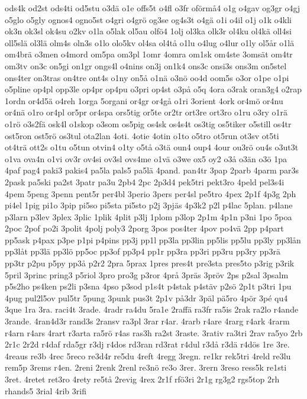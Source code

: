 {ods4k
od2st
ods4ti
od5stu
o3dä
o1e
offs5t
o4fl
o3fr
oförmå4
o1g
o4gav
og3gr
o4gj
o5glo
o5gly
ognos4
ogno5st
o4gri
o4grö
og3se
og4s3t
o4gä
o1i
o4il
o1j
o1k
o4kli
ok3n
ok3sl
ok4su
o2kv
o1la
o5lak
ol5au
olfö4
1olj
ol3ka
olk3r
ol4ku
ol4kä
oll4si
oll5slä
ol3lä
olm4s
oln3s
o1lo
olo5kv
ol4sa
ol4tå
o1lu
o4lug
o4lur
o1ly
ol5år
o1lä
om4brä
o3men
o4mord
om5pa
om3pl
1omr
4omra
om1sk
om4ste
3omsät
om4tr
om3tv
on3c
on5gi
on1gr
ongs4l
o4nins
on3j
on1k4
ons3c
onsi3s
ons3m
on5stel
ons4ter
on3tras
on4tre
ont4s
o1ny
on5å
o1nä
o3nö
oo4d
oom5s
o3or
o1pe
o1pi
o5pline
op4pl
opp3le
op4pr
op4pu
o3pri
op4st
o3på
o5q
4ora
o3rak
oran3g4
o2rap
1ordn
or4d5ä
o4reh
1orga
5organi
or4gr
or4gå
o1ri
3orient
4ork
or4mö
or4nu
or4nä
o1ro
or4pl
or5pr
or4spa
ors5tig
or5te
or2tr
ort3re
ort3ro
o1ru
o3ry
o1rä
o1rö
o3s2fä
osk4l
o1skop
o3som
os5pig
os4sk
os4s4t
os3tig
os5tiker
o5still
os4tr
ost5ron
ost5rö
os3tul
ota2lan
4oti.
4otie
4otin
o1to
o5tro
ot5run
ot3sv
ot5ti
ot4trä
ott2s
o1tu
o5tun
otvin4
o1ty
o5tå
o3tä
oun4
oup4
4our
ou3rö
ou4s
o3ut3t
o1va
ova4n
o1vi
ov3r
ov4si
ov3sl
ovs4me
o1vä
o3we
ox5
oy2
o3å
o3än
o3ö
1pa
4paf
pag4
paki3
pakis4
pa5la
pals5
pa5lä
4pand.
pan4tr
3pap
2parb
4parm
par3s
2pask
pa5ski
pa2st
3patr
pa3u
2pb4
2pc
2p3d4
pek5tri
pekt3ro
4peld
pel3s4i
4pem
5peng
3penn
pent5r
per4bl
3perio
3pers
per4sl
pe5tro
4pex
2p1f
4p3g
2ph
pi4el
1pig
pi1o
3pip
pi5so
pi5sta
pi5sto
p2j
3pjäs
4p3k2
p2l
p4lac
5plan.
p4lane
p3larn
p3lev
3plex
3plic
1plik
4plit
p3lj
1plom
p3lop
2p1m
4p1n
p3ni
1po
5poa
2poc
2pof
po2i
3polit
4polj
poly3
2porg
3pos
pos4ter
4pov
po4vä
2pp
p4part
pp5ask
p4pax
p3pe
p1pi
p4pins
pp3j
pp1l
pp3la
pp3lin
pp5lis
pp5lu
pp3ly
pp3lån
pp3låt
pp3lä
pp3lö
pp5oc
pp3of
pp3p4
pp1r
pp3ra
pp3ri
pp3ru
pp3ry
pp3rä
pp3tr
p2pu
p5py
pp3å
p2r2
2pra
5prax
1pres
pres4t
pre3sta
pres5to
p3rig
p3rik
5pril
3princ
pring3
p5riol
3pro
pro3g
p3ror
4prå
3präs
3pröv
2ps
p2sal
3psalm
p5s2ho
ps4ken
ps2li
p3sna
4pso
p3sod
p1s4t
p4stak
p4stäv
p2sö
2p1t
p3tri
1pu
4pug
pul2l5ov
pul5tr
5pung
3punk
pus3t
2p1v
på3dr
3päl
pä5ro
4pör
3pé
qu4
3que
1ra
3ra.
raci4t
3rade.
4radr
ra4du
5ra1e
2raffä
ra3fr
ra5is
2rak
ra2lo
r4ande
3rande.
4ran4d3r
rand3s
2ransv
ra3pl
3rar
r4ar.
4rarb
r4are
4rarg
r4ark
4rarm
r4arn
r4ars
4rart
r3arta
ra5rö
r4as
ras3h
ra2st
3raste.
3rativ
ra3tri
2rav
ra5yo
2rb
2r1c
2r2d
r4daf
rda5gr
r3dj
r4dos
rd3ran
rd3rat
r4dul
r3då
r3dä
r4dös
1re
3re.
4reaus
re3b
4rec
5reco
re3d4r
re5du
4reft
4regg
3regn.
re1kr
rek5tri
4reld
re3lu
rem5p
3rems
r4en.
2reni
2renk
2renl
re3nö
re3o
3rer.
3rern
3reso
ress5k
re1sti
3ret.
4retet
ret3ro
4rety
re5tå
2revig
4rex
2r1f
rfö3ri
2r1g
rg3g2
rgs5top
2rh
rhands5
3rial
4rib
3rifi
}

